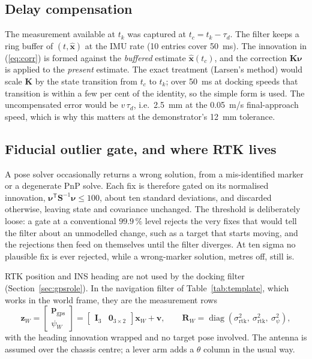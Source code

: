 \documentclass[11pt,a4paper]{article}
\newcommand{\vect}[1]{\bm{#1}}
\newcommand{\mat}[1]{\bm{#1}}
\newcommand{\T}{^{\mathsf{T}}}
\newcommand{\diag}{\operatorname{diag}}
\newcommand{\hx}{\hat{\vect{x}}}
\begin{document}
\subsection{Delay compensation}
\label{sec:delay}
The measurement available at $t_k$ was captured at $t_c = t_k-\tau_d$. The filter keeps a ring buffer of $(t,\hx)$ at the IMU rate (10 entries cover 50~ms). The innovation in (\ref{eq:corr}) is formed against the \emph{buffered} estimate $\hx(t_c)$, and the correction $\mat K\vect\nu$ is applied to the \emph{present} estimate. The exact treatment (Larsen's method) would scale $\mat K$ by the state transition from $t_c$ to $t_k$; over 50~ms at docking speeds that transition is within a few per cent of the identity, so the simple form is used. The uncompensated error would be $v\,\tau_d$, i.e.\ 2.5~mm at the 0.05~m/s final-approach speed, which is why this matters at the demonstrator's 12~mm tolerance.

\subsection{Fiducial outlier gate, and where RTK lives}
\label{sec:gps}
A pose solver occasionally returns a wrong solution, from a mis-identified marker or a degenerate PnP solve. Each fix is therefore gated on its normalised innovation, $\vect\nu\T\mat S^{-1}\vect\nu\le 100$, about ten standard deviations, and discarded otherwise, leaving state and covariance unchanged. The threshold is deliberately loose: a gate at a conventional $99.9\,\%$ level rejects the very fixes that would tell the filter about an unmodelled change, such as a target that starts moving, and the rejections then feed on themselves until the filter diverges. At ten sigma no plausible fix is ever rejected, while a wrong-marker solution, metres off, still is.

RTK position and INS heading are not used by the docking filter (Section~\ref{sec:gpsrole}). In the navigation filter of Table~\ref{tab:template}, which works in the world frame, they are the measurement rows
\begin{equation}
\vect z_W = \begin{bmatrix}\vect p_{\mathrm{gps}}\\ \psi_W\end{bmatrix} = \begin{bmatrix}\mat I_3 & \mat 0_{3\times 2}\end{bmatrix}\vect x_W + \vect v,
\qquad
\mat R_W = \diag(\sigma_{\mathrm{rtk}}^2,\ \sigma_{\mathrm{rtk}}^2,\ \sigma_\psi^2),
\end{equation}
with the heading innovation wrapped and no target pose involved. The antenna is assumed over the chassis centre; a lever arm adds a $\theta$ column in the usual way.
\end{document}
